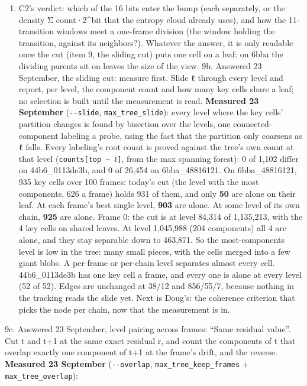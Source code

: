 \begin{enumerate}
\item C2's verdict: which of the 16 bits enter the bump (each separately, or the density Σ count·2\textasciicircum{}bit that the entropy cloud already uses), and how the 11-transition windows meet a one-frame division (the window holding the transition, against its neighbors?). Whatever the answer, it is only readable once the cut (item 9, the sliding cut) puts one cell on a leaf: on 6bba the dividing parents sit on leaves the size of the view. 9b. Answered 23 September, the sliding cut: measure first. Slide ℓ through every level and report, per level, the component count and how many key cells share a leaf; no selection is built until the measurement is read. \textbf{Measured 23 September} (\texttt{-\allowbreak{}-\allowbreak{}slide}, \texttt{max\_\allowbreak{}tree\_\allowbreak{}slide}): every level where the key cells' partition changes is found by bisection over the levels, one connected-component labeling a probe, using the fact that the partition only coarsens as ℓ falls. Every labeling's root count is proved against the tree's own count at that level (\texttt{counts[top − ℓ]}, from the max spanning forest): 0 of 1,102 differ on 44b6\_\allowbreak{}0113de3b, and 0 of 26,454 on 6bba\_\allowbreak{}48816121. On 6bba\_\allowbreak{}48816121, 935 key cells over 100 frames: today's cut (the level with the most components, 626 a frame) holds 931 of them, and only \textbf{50} are alone on their leaf. At each frame's best single level, \textbf{903} are alone. At some level of its own chain, \textbf{925} are alone. Frame 0: the cut is at level 84,314 of 1,135,213, with the 4 key cells on shared leaves. At level 1,045,988 (204 components) all 4 are alone, and they stay separable down to 463,871. So the most-components level is low in the tree: many small pieces, with the cells merged into a few giant blobs. A per-frame or per-chain level separates almost every cell. 44b6\_\allowbreak{}0113de3b has one key cell a frame, and every one is alone at every level (52 of 52). Edges are unchanged at 38/12 and 856/55/7, because nothing in the tracking reads the slide yet. Next is Doug's: the coherence criterion that picks the node per chain, now that the measurement is in.
\end{enumerate}

9c. Answered 23 September, level pairing across frames: “Same residual value”. Cut t and t+1 at the same exact residual r, and count the components of t that overlap exactly one component of t+1 at the frame's drift, and the reverse. \textbf{Measured 23 September} (\texttt{-\allowbreak{}-\allowbreak{}overlap}, \texttt{max\_\allowbreak{}tree\_\allowbreak{}keep\_\allowbreak{}frames} + \texttt{max\_\allowbreak{}tree\_\allowbreak{}overlap}):

